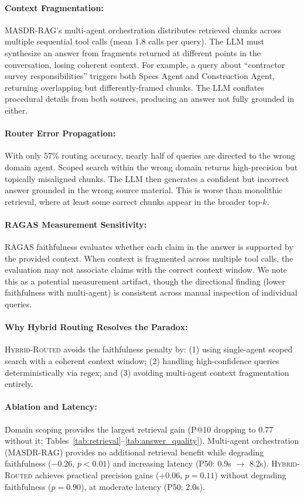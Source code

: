 \documentclass{article}
\newcommand{\systemname}{\textsc{MASDR-RAG}}
\newcommand{\hybridname}{\textsc{Hybrid-Routed}}
\begin{document}
\paragraph{Context Fragmentation:} \systemname{}'s multi-agent orchestration distributes retrieved chunks across multiple sequential tool calls (mean 1.8 calls per query). The LLM must synthesize an answer from fragments returned at different points in the conversation, losing coherent context. For example, a query about ``contractor survey responsibilities'' triggers both Specs Agent and Construction Agent, returning overlapping but differently-framed chunks. The LLM conflates procedural details from both sources, producing an answer not fully grounded in either.

\paragraph{Router Error Propagation:} With only 57\% routing accuracy, nearly half of queries are directed to the wrong domain agent. Scoped search within the wrong domain returns high-precision but topically misaligned chunks. The LLM then generates a confident but incorrect answer grounded in the wrong source material. This is worse than monolithic retrieval, where at least some correct chunks appear in the broader top-$k$.

\paragraph{RAGAS Measurement Sensitivity:} RAGAS faithfulness evaluates whether each claim in the answer is supported by the provided context. When context is fragmented across multiple tool calls, the evaluation may not associate claims with the correct context window. We note this as a potential measurement artifact, though the directional finding (lower faithfulness with multi-agent) is consistent across manual inspection of individual queries.

\paragraph{Why Hybrid Routing Resolves the Paradox:} \hybridname{} avoids the faithfulness penalty by: (1) using single-agent scoped search with a coherent context window; (2) handling high-confidence queries deterministically via regex; and (3) avoiding multi-agent context fragmentation entirely.

\paragraph{Ablation and Latency:} Domain scoping provides the largest retrieval gain (P@10 dropping to 0.77 without it; Tables~\ref{tab:retrieval}--\ref{tab:answer_quality}). Multi-agent orchestration (\systemname{}) provides no additional retrieval benefit while degrading faithfulness ($-$0.26, $p < 0.01$) and increasing latency (P50: 0.9s $\rightarrow$ 8.2s). \hybridname{} achieves practical precision gains ($+$0.06, $p = 0.11$) without degrading faithfulness ($p = 0.90$), at moderate latency (P50: 2.0s).
\end{document}
